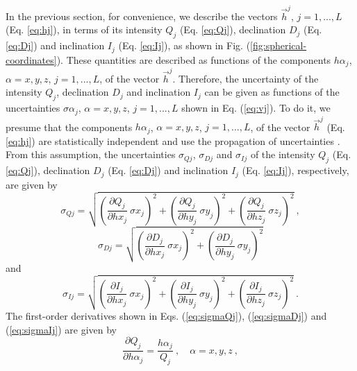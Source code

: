 \documentclass[journal abbreviation, npg]{copernicus}
\begin{document}
In the previous section, for convenience, we describe the vectors $\vec{h}^{j}$, $j = 1, ..., L$ (Eq. \ref{eq:hj}), in terms of its intensity $Q_{j}$ (Eq. \ref{eq:Qj}), declination $D_{j}$ (Eq. \ref{eq:Dj}) and inclination $I_{j}$ (Eq. \ref{eq:Ij}), as shown in Fig. (\ref{fig:spherical-coordinates}). These quantities are described as functions of the components ${h \alpha}_{j}$, $\alpha = x, y, z$, $j = 1, ..., L$, of the vector $\vec{h}^{j}$. Therefore, the uncertainty of the intensity $Q_{j}$, declination $D_{j}$ and inclination $I_{j}$ can be given as functions of the uncertainties ${\sigma \alpha}_{j}$, $\alpha = x, y, z$, $j = 1, ..., L$ shown in Eq. (\ref{eq:vj}). To do it, we presume that the components ${h \alpha}_{j}$, $\alpha = x, y, z$, $j = 1, ..., L$, of the vector $\vec{h}^{j}$ (Eq. \ref{eq:hj}) are statistically independent and use the propagation of uncertainties \citep{fornasini2008}. From this assumption, the uncertainties $\sigma_{Qj}$, $\sigma_{Dj}$ and $\sigma_{Ij}$ of the intensity $Q_{j}$ (Eq. \ref{eq:Qj}), declination $D_{j}$ (Eq. \ref{eq:Dj}) and inclination $I_{j}$ (Eq. \ref{eq:Ij}), respectively, are given by
\begin{equation}
\sigma_{Qj} = \sqrt{\left( \frac{\partial Q_{j}}{\partial hx_{j}} \: \sigma x_{j} \right)^{2} +
                    \left( \frac{\partial Q_{j}}{\partial hy_{j}} \: \sigma y_{j} \right)^{2} +
                    \left( \frac{\partial Q_{j}}{\partial hz_{j}} \: \sigma z_{j} \right)^{2}} \: ,
\label{eq:sigmaQj}
\end{equation}
\begin{equation}
\sigma_{Dj} = \sqrt{\left( \frac{\partial D_{j}}{\partial hx_{j}} \: \sigma x_{j} \right)^{2} +
                    \left( \frac{\partial D_{j}}{\partial hy_{j}} \: \sigma y_{j} \right)^{2}}
\label{eq:sigmaDj}
\end{equation}
and
\begin{equation}
\sigma_{Ij} = \sqrt{\left( \frac{\partial I_{j}}{\partial hx_{j}} \: \sigma x_{j} \right)^{2} +
                    \left( \frac{\partial I_{j}}{\partial hy_{j}} \: \sigma y_{j} \right)^{2} +
                    \left( \frac{\partial I_{j}}{\partial hz_{j}} \: \sigma z_{j} \right)^{2}} \: .
\label{eq:sigmaIj}
\end{equation}
The first-order derivatives shown in Eqs. (\ref{eq:sigmaQj}), (\ref{eq:sigmaDj}) and (\ref{eq:sigmaIj}) are given by
\begin{equation}
\dfrac{\partial Q_{j}}{\partial h \alpha_{j}} = \dfrac{h \alpha_{j}}{Q_{j}} \: , \quad \alpha = x, y, z \: ,
\label{eq:dQj-dhalphaj}
\end{equation}
\end{document}
